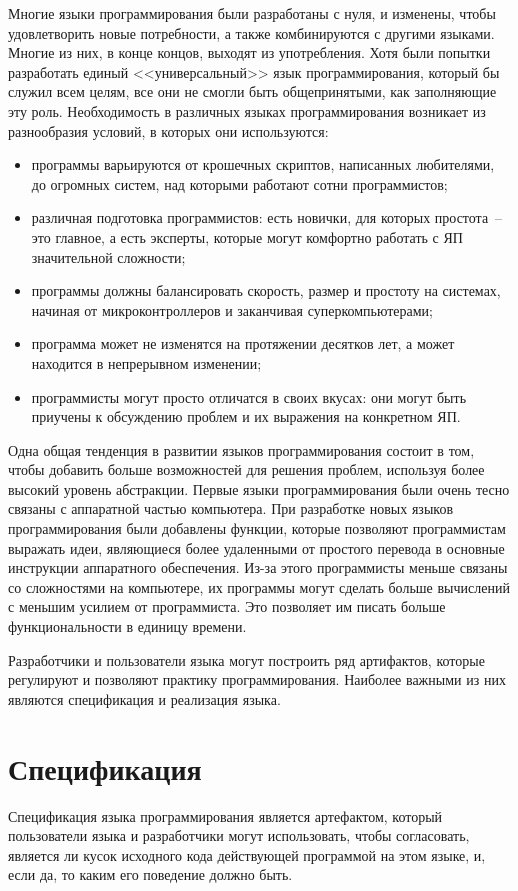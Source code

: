 Многие языки программирования были разработаны с нуля, и изменены, чтобы
удовлетворить новые потребности, а также комбинируются с другими языками.
Многие из них, в конце концов, выходят из употребления. Хотя были попытки
разработать единый <<универсальный>> язык программирования, который бы служил
всем целям, все они не смогли быть общепринятыми, как заполняющие эту роль.
Необходимость в различных языках программирования возникает из разнообразия
условий, в которых они используются:
\begin{itemize}
  \item программы варьируются от крошечных скриптов, написанных любителями, до
    огромных систем, над которыми работают сотни программистов;
  \item различная подготовка программистов: есть новички, для которых
    простота~-- это главное, а есть эксперты, которые могут комфортно работать
    с ЯП значительной сложности;
  \item программы должны балансировать скорость, размер и простоту на системах,
    начиная от микроконтроллеров и заканчивая суперкомпьютерами;
  \item программа может не изменятся на протяжении десятков лет, а может
    находится в непрерывном изменении;
  \item программисты могут просто отличатся в своих вкусах: они могут быть
    приучены к обсуждению проблем и их выражения на конкретном ЯП.
\end{itemize}

Одна общая тенденция в развитии языков программирования состоит в том, чтобы
добавить больше возможностей для решения проблем, используя более высокий
уровень абстракции. Первые языки программирования были очень тесно связаны с
аппаратной частью компьютера. При разработке новых языков программирования были
добавлены функции, которые позволяют программистам выражать идеи, являющиеся
более удаленными от простого перевода в основные инструкции аппаратного
обеспечения. Из-за этого программисты меньше связаны со сложностями на
компьютере, их программы могут сделать больше вычислений с меньшим усилием от
программиста. Это позволяет им писать больше функциональности в единицу
времени.

Разработчики и пользователи языка могут построить ряд артифактов, которые
регулируют и позволяют практику программирования. Наиболее важными из них
являются спецификация и реализация языка.

\section{Спецификация}
Спецификация языка программирования является артефактом, который пользователи
языка и разработчики могут использовать, чтобы согласовать, является ли кусок
исходного кода действующей программой на этом языке, и, если да, то каким его
поведение должно быть.

